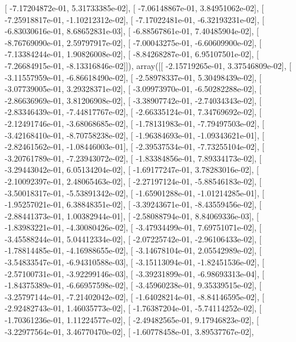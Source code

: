 \documentclass{article}
\begin{document}
       [ -7.17204872e-01,   5.31733385e-02],
       [ -7.06148867e-01,   3.84951062e-02],
       [ -7.25918817e-01,  -1.10212312e-02],
       [ -7.17022481e-01,  -6.32193231e-02],
       [ -6.83030616e-01,   8.68652831e-03],
       [ -6.88567861e-01,   7.40485904e-02],
       [ -8.76769090e-01,   2.59797917e-02],
       [ -7.00043275e-01,  -6.60609900e-02],
       [ -7.13384244e-01,   1.90826008e-02],
       [ -8.84268287e-01,   6.95107501e-02],
       [ -7.26684915e-01,  -8.13316846e-02]]), array([[ -2.15719265e-01,   3.37546809e-02],
       [ -3.11557959e-01,  -6.86618490e-02],
       [ -2.58978337e-01,   5.30498439e-02],
       [ -3.07739005e-01,   3.29328371e-02],
       [ -3.09973970e-01,  -6.50282288e-02],
       [ -2.86636969e-01,   3.81206908e-02],
       [ -3.38907742e-01,  -2.74034343e-02],
       [ -2.83346439e-01,  -7.44817767e-02],
       [ -2.66335124e-01,   7.34769692e-02],
       [ -2.12491746e-01,  -3.68068685e-02],
       [ -1.78131983e-01,  -7.79497503e-02],
       [ -3.42168410e-01,  -8.70758238e-02],
       [ -1.96384693e-01,  -1.09343621e-01],
       [ -2.82461562e-01,  -1.08446003e-01],
       [ -2.39537534e-01,  -7.73255104e-02],
       [ -3.20761789e-01,  -7.23943072e-02],
       [ -1.83384856e-01,   7.89334173e-02],
       [ -3.29443042e-01,   6.05134204e-02],
       [ -1.69177247e-01,   3.78283016e-02],
       [ -2.10092397e-01,   2.48065463e-02],
       [ -2.27197124e-01,  -5.88546183e-02],
       [ -3.50018317e-01,  -5.53891342e-02],
       [ -1.65901288e-01,  -1.01214285e-01],
       [ -1.95257021e-01,   6.38848351e-02],
       [ -3.39243671e-01,  -8.43559456e-02],
       [ -2.88441373e-01,   1.00382944e-01],
       [ -2.58088794e-01,   8.84069336e-03],
       [ -1.83983221e-01,  -4.30080426e-02],
       [ -3.47934499e-01,   7.69751071e-02],
       [ -3.45588244e-01,   5.04412334e-02],
       [ -2.07225742e-01,  -2.96106433e-02],
       [ -1.78814485e-01,  -4.16988655e-02],
       [ -3.14678104e-01,   2.05542989e-02],
       [ -3.54833547e-01,  -6.94310588e-03],
       [ -3.15113094e-01,  -1.82451536e-02],
       [ -2.57100731e-01,  -3.92299146e-03],
       [ -3.39231899e-01,  -6.98693313e-04],
       [ -1.84375389e-01,  -6.66957598e-02],
       [ -3.45960238e-01,   9.35339515e-02],
       [ -3.25797144e-01,  -7.21402042e-02],
       [ -1.64028214e-01,  -8.84146595e-02],
       [ -2.92482743e-01,   1.46035773e-02],
       [ -1.76387204e-01,  -5.74114252e-02],
       [ -1.70361236e-01,   1.11224577e-02],
       [ -2.49482565e-01,   9.17946823e-02],
       [ -3.22977564e-01,   3.46770470e-02],
       [ -1.60778458e-01,   3.89537767e-02],
\end{document}
